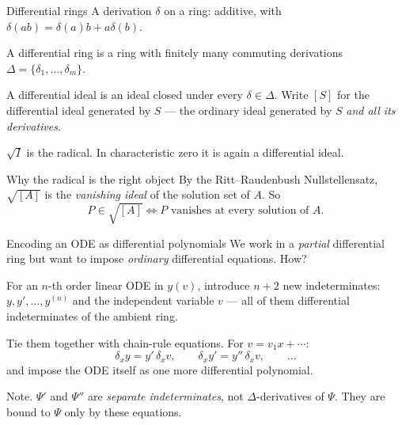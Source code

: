 \documentclass[10pt,aspectratio=169]{beamer}
\begin{document}
\begin{frame}{Differential rings}
A \alert{derivation} $\delta$ on a ring: additive, with
$\delta(ab) = \delta(a)b + a\delta(b)$.

\medskip
A \alert{differential ring} is a ring with finitely many commuting derivations
$\Delta = \{\delta_{1},\dots,\delta_{m}\}$.

\pause
\medskip
A \alert{differential ideal} is an ideal closed under every $\delta \in \Delta$.
Write $[S]$ for the differential ideal generated by $S$ --- the ordinary ideal
generated by $S$ \emph{and all its derivatives}.

\pause
\medskip
$\sqrt{I}$ is the \alert{radical}. In characteristic zero it is again a
differential ideal.

\pause
\begin{block}{Why the radical is the right object}
By the Ritt--Raudenbush Nullstellensatz, $\sqrt{[A]}$ is the \emph{vanishing
ideal} of the solution set of $A$. So
\[
  P \in \sqrt{[A]}
  \iff
  \text{$P$ vanishes at every solution of $A$.}
\]
\end{block}
\end{frame}

\begin{frame}{Encoding an ODE as differential polynomials}
We work in a \emph{partial} differential ring but want to impose \emph{ordinary}
differential equations. How?

\pause
\medskip
For an $n$-th order linear ODE in $y(v)$, introduce $n+2$ new indeterminates:
$y, y', \dots, y^{(n)}$ and the independent variable $v$ --- all of them
differential indeterminates of the ambient ring.

\pause
\medskip
Tie them together with chain-rule equations. For $v = v_{1}x + \cdots$:
\[
  \delta_{x} y = y' \,\delta_{x} v, \qquad
  \delta_{x} y' = y'' \,\delta_{x} v, \qquad \dots
\]
and impose the ODE itself as one more differential polynomial.

\pause
\medskip
\alert{Note.} $\Psi'$ and $\Psi''$ are \emph{separate indeterminates}, not
$\Delta$-derivatives of $\Psi$. They are bound to $\Psi$ only by these equations.
\end{frame}
\end{document}

